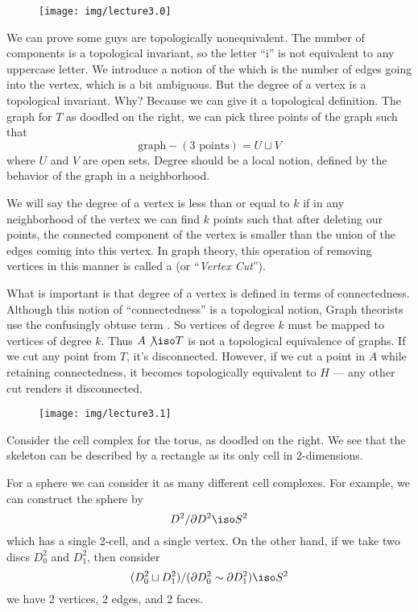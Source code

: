 \begin{wrapfigure}{r}{0.7in}
        \texttt{[image: img/lecture3.0]}
\end{wrapfigure}
We can prove some guys are topologically nonequivalent. The
number of components is a topological invariant, so the letter
``i'' is not equivalent to any uppercase letter. We introduce a
notion of the  which is the number of
edges going into the vertex, which is a bit ambiguous.
But the degree of a vertex is a topological invariant. Why?
Because we can give it a topological definition. The graph for
$T$ as doodled on the right, we can pick three points of the
graph such that
\begin{equation}
\mbox{graph}-(\mbox{3 points})=U\sqcup V
\end{equation}
where $U$ and $V$ are open sets. Degree should be a local notion,
defined by the behavior of the graph in a neighborhood.

We will say the degree of a vertex is less than or equal to $k$
if in any neighborhood of the vertex we can find $k$ points such
that after deleting our points, the connected component of the
vertex is smaller than the union of the edges coming into this
vertex. In graph theory, this operation of removing vertices in
this manner is called a  (or ``\emph{Vertex Cut\/}'').

What is important is that degree of a vertex is defined in terms
of connectedness. Although this notion of ``connectedness'' is a
topological notion, Graph theorists use the confusingly obtuse
term . So vertices of degree $k$ must be mapped to
vertices of degree $k$. Thus $A\not\iso T$ is not a topological
equivalence of graphs. If we cut any point from $T$, it's
disconnected. However, if we cut a point in $A$ while retaining
connectedness, it becomes topologically equivalent to $H$ --- any
other cut renders it disconnected.

\begin{wrapfigure}{r}{1in}
        \texttt{[image: img/lecture3.1]}
\end{wrapfigure}
Consider the cell complex for the torus, as doodled on the right.
We see that the skeleton can be described by a rectangle as its
only cell in 2-dimensions.

For a sphere we can consider it as many different cell
complexes. For example, we can construct the sphere by
\begin{equation}
D^{2}/\partial D^{2}\iso S^{2}
\end{equation}
which has a single 2-cell, and a single vertex. On the other
hand, if we take two discs $D^{2}_{0}$ and $D^{2}_{1}$, then
consider
\begin{equation}
(D^{2}_{0}\sqcup D^{2}_{1})/(\partial D^{2}_{0}\sim \partial
D^{2}_{1})\iso S^{2}
\end{equation}
we have 2 vertices, 2 edges, and 2 faces.

